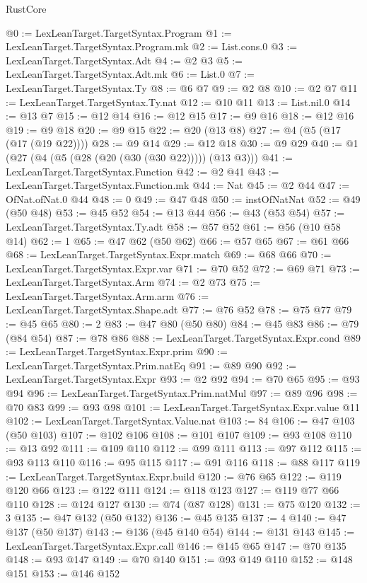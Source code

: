 \begin{lexlean}{RustCore}
\begin{coremodule}
@0 := LexLeanTarget.TargetSyntax.Program
@1 := LexLeanTarget.TargetSyntax.Program.mk
@2 := List.cons.{0}
@3 := LexLeanTarget.TargetSyntax.Adt
@4 := @2 @3
@5 := LexLeanTarget.TargetSyntax.Adt.mk
@6 := List.{0}
@7 := LexLeanTarget.TargetSyntax.Ty
@8 := @6 @7
@9 := @2 @8
@10 := @2 @7
@11 := LexLeanTarget.TargetSyntax.Ty.nat
@12 := @10 @11
@13 := List.nil.{0}
@14 := @13 @7
@15 := @12 @14
@16 := @12 @15
@17 := @9 @16
@18 := @12 @16
@19 := @9 @18
@20 := @9 @15
@22 := @20 (@13 @8)
@27 := @4 (@5 (@17 (@17 (@19 @22))))
@28 := @9 @14
@29 := @12 @18
@30 := @9 @29
@40 := @1 (@27 (@4 (@5 (@28 (@20 (@30 (@30 @22))))) (@13 @3)))
@41 := LexLeanTarget.TargetSyntax.Function
@42 := @2 @41
@43 := LexLeanTarget.TargetSyntax.Function.mk
@44 := Nat
@45 := @2 @44
@47 := OfNat.ofNat.{0} @44
@48 := 0
@49 := @47 @48
@50 := instOfNatNat
@52 := @49 (@50 @48)
@53 := @45 @52
@54 := @13 @44
@56 := @43 (@53 @54)
@57 := LexLeanTarget.TargetSyntax.Ty.adt
@58 := @57 @52
@61 := @56 (@10 @58 @14)
@62 := 1
@65 := @47 @62 (@50 @62)
@66 := @57 @65
@67 := @61 @66
@68 := LexLeanTarget.TargetSyntax.Expr.match
@69 := @68 @66
@70 := LexLeanTarget.TargetSyntax.Expr.var
@71 := @70 @52
@72 := @69 @71
@73 := LexLeanTarget.TargetSyntax.Arm
@74 := @2 @73
@75 := LexLeanTarget.TargetSyntax.Arm.arm
@76 := LexLeanTarget.TargetSyntax.Shape.adt
@77 := @76 @52
@78 := @75 @77
@79 := @45 @65
@80 := 2
@83 := @47 @80 (@50 @80)
@84 := @45 @83
@86 := @79 (@84 @54)
@87 := @78 @86
@88 := LexLeanTarget.TargetSyntax.Expr.cond
@89 := LexLeanTarget.TargetSyntax.Expr.prim
@90 := LexLeanTarget.TargetSyntax.Prim.natEq
@91 := @89 @90
@92 := LexLeanTarget.TargetSyntax.Expr
@93 := @2 @92
@94 := @70 @65
@95 := @93 @94
@96 := LexLeanTarget.TargetSyntax.Prim.natMul
@97 := @89 @96
@98 := @70 @83
@99 := @93 @98
@101 := LexLeanTarget.TargetSyntax.Expr.value @11
@102 := LexLeanTarget.TargetSyntax.Value.nat
@103 := 84
@106 := @47 @103 (@50 @103)
@107 := @102 @106
@108 := @101 @107
@109 := @93 @108
@110 := @13 @92
@111 := @109 @110
@112 := @99 @111
@113 := @97 @112
@115 := @93 @113 @110
@116 := @95 @115
@117 := @91 @116
@118 := @88 @117
@119 := LexLeanTarget.TargetSyntax.Expr.build
@120 := @76 @65
@122 := @119 @120 @66
@123 := @122 @111
@124 := @118 @123
@127 := @119 @77 @66 @110
@128 := @124 @127
@130 := @74 (@87 @128)
@131 := @75 @120
@132 := 3
@135 := @47 @132 (@50 @132)
@136 := @45 @135
@137 := 4
@140 := @47 @137 (@50 @137)
@143 := @136 (@45 @140 @54)
@144 := @131 @143
@145 := LexLeanTarget.TargetSyntax.Expr.call
@146 := @145 @65
@147 := @70 @135
@148 := @93 @147
@149 := @70 @140
@151 := @93 @149 @110
@152 := @148 @151
@153 := @146 @152

\end{coremodule}
\end{lexlean}

